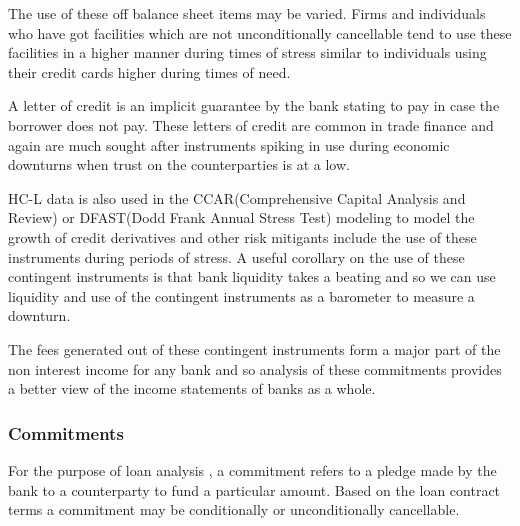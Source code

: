 \documentclass[conference]{IEEEtran}
\begin{document}
    The use of these off balance sheet items may be varied. Firms and individuals who have got facilities which are not unconditionally cancellable tend to use these facilities in a higher manner during times of stress similar to individuals using their credit cards higher during times of need.
    
    A letter of credit is an implicit guarantee by the bank stating to pay in case the borrower does not pay. These letters of credit are common in trade finance and again are much sought after instruments spiking in use during economic downturns when trust on the counterparties is at a low.
    
    HC-L data is also used in the CCAR(Comprehensive Capital Analysis and Review) or DFAST(Dodd Frank Annual Stress Test) modeling to model the growth of credit derivatives and other risk mitigants include the use of these instruments during periods of stress. A useful corollary on the use of these contingent instruments is that bank liquidity takes a beating and so we can use liquidity and use of the contingent instruments as a barometer to measure a downturn.
    
    The fees generated out of these contingent instruments form a major part of the non interest income for any bank and so analysis of these commitments provides a better view of the income statements of banks as a whole.
    
    \subsubsection{Commitments}
         For the purpose of loan analysis , a commitment refers to a pledge made by the bank to a counterparty to fund a particular amount. Based on the loan contract terms a commitment may be conditionally or unconditionally cancellable.  
         
\end{document}
